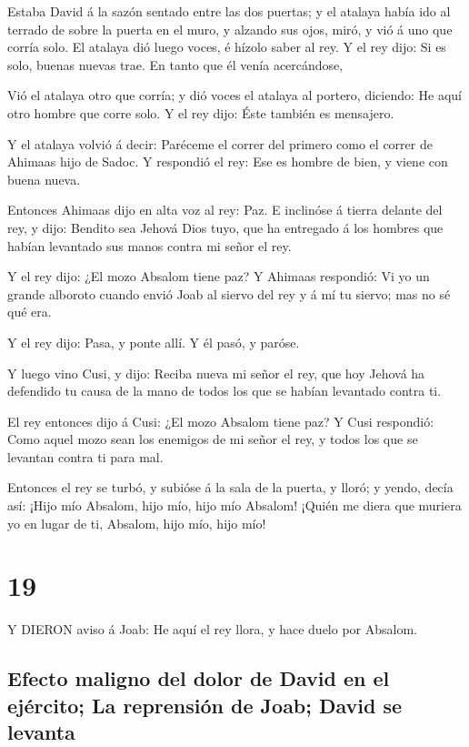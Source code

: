  Estaba David á la sazón sentado entre las dos puertas; y
el atalaya había ido al terrado de sobre la puerta en el muro, y alzando
sus ojos, miró, y vió á uno que corría solo.  El atalaya
dió luego voces, é hízolo saber al rey. Y el rey dijo: Si es solo,
buenas nuevas trae. En tanto que él venía acercándose,

 Vió el atalaya otro que corría; y dió voces el atalaya al
portero, diciendo: He aquí otro hombre que corre solo. Y el rey dijo:
Éste también es mensajero.

 Y el atalaya volvió á decir: Paréceme el correr del
primero como el correr de Ahimaas hijo de Sadoc. Y respondió el rey: Ese
es hombre de bien, y viene con buena nueva.

 Entonces Ahimaas dijo en alta voz al rey: Paz. E inclinóse
á tierra delante del rey, y dijo: Bendito sea Jehová Dios tuyo, que ha
entregado á los hombres que habían levantado sus manos contra mi señor
el rey.

 Y el rey dijo: ¿El mozo Absalom tiene paz? Y Ahimaas
respondió: Vi yo un grande alboroto cuando envió Joab al siervo del rey
y á mí tu siervo; mas no sé qué era.

 Y el rey dijo: Pasa, y ponte allí. Y él pasó, y paróse.

 Y luego vino Cusi, y dijo: Reciba nueva mi señor el rey,
que hoy Jehová ha defendido tu causa de la mano de todos los que se
habían levantado contra ti.

 El rey entonces dijo á Cusi: ¿El mozo Absalom tiene paz? Y
Cusi respondió: Como aquel mozo sean los enemigos de mi señor el rey, y
todos los que se levantan contra ti para mal.

 Entonces el rey se turbó, y subióse á la sala de la
puerta, y lloró; y yendo, decía así: ¡Hijo mío Absalom, hijo mío, hijo
mío Absalom! ¡Quién me diera que muriera yo en lugar de ti, Absalom,
hijo mío, hijo mío!

\hypertarget{section-18}{%
\section{19}\label{section-18}}

 Y DIERON aviso á Joab: He aquí el rey llora, y hace duelo
por Absalom.

\hypertarget{efecto-maligno-del-dolor-de-david-en-el-ejuxe9rcito-la-reprensiuxf3n-de-joab-david-se-levanta}{%
\subsection{Efecto maligno del dolor de David en el ejército; La
reprensión de Joab; David se
levanta}\label{efecto-maligno-del-dolor-de-david-en-el-ejuxe9rcito-la-reprensiuxf3n-de-joab-david-se-levanta}}

